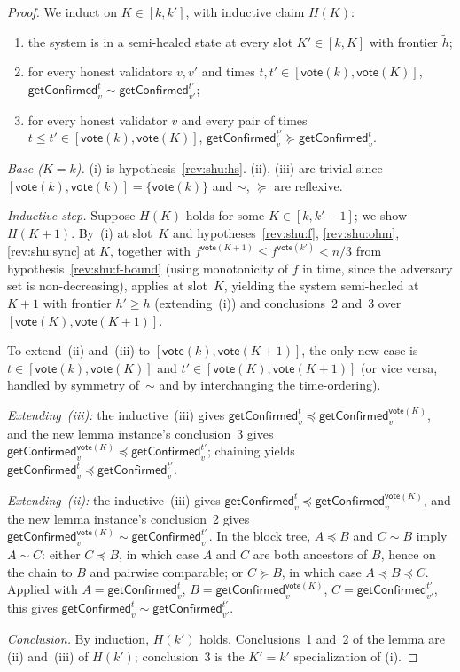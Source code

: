 \ifx\litemode\undefined\documentclass{article}\fi
\newcommand{\vote}{\ensuremath{\mathsf{vote}}}
\newcommand{\comm}[1]{\ensuremath{\widetilde{#1}}}
\newcommand{\getConfirmed}{\textsf{getConfirmed}\xspace}
\theoremstyle{plain}
\theoremstyle{definition}
\theoremstyle{remark}
\begin{document}
\begin{proof}
We induct on $K \in [k, k']$, with inductive claim $H(K)$:
\begin{enumerate}
  \item the system is in a semi-healed state at every slot $K' \in [k, K]$ with frontier $\comm{h}$;
  \item for every honest validators $v, v'$ and times $t, t' \in [\vote(k), \vote(K)]$, $\getConfirmed_v^{t} \sim \getConfirmed_{v'}^{t'}$;
  \item for every honest validator $v$ and every pair of times $t \leq t' \in [\vote(k), \vote(K)]$, $\getConfirmed_v^{t'} \succeq \getConfirmed_v^t$.
\end{enumerate}

\emph{Base ($K = k$).}
(i) is hypothesis~\ref{rev:shu:hs}.
(ii), (iii) are trivial since $[\vote(k), \vote(k)] = \{\vote(k)\}$ and $\sim$, $\succeq$ are reflexive.

\emph{Inductive step.}
Suppose $H(K)$ holds for some $K \in [k, k'-1]$; we show $H(K{+}1)$.
By~(i) at slot~$K$ and hypotheses~\ref{rev:shu:f}, \ref{rev:shu:ohm}, \ref{rev:shu:sync} at $K$, together with $f^{\vote(K+1)} \leq f^{\vote(k')} < n/3$ from hypothesis~\ref{rev:shu:f-bound} (using monotonicity of $f$ in time, since the adversary set is non-decreasing),  applies at slot~$K$, yielding the system semi-healed at $K{+}1$ with frontier $\comm{h}' \geq \comm{h}$ (extending~(i)) and conclusions~2 and~3 over $[\vote(K), \vote(K{+}1)]$.

To extend~(ii) and~(iii) to $[\vote(k), \vote(K{+}1)]$, the only new case is $t \in [\vote(k), \vote(K)]$ and $t' \in [\vote(K), \vote(K{+}1)]$ (or vice versa, handled by symmetry of~$\sim$ and by interchanging the time-ordering).

\emph{Extending~(iii):}
the inductive~(iii) gives $\getConfirmed_v^t \preceq \getConfirmed_v^{\vote(K)}$, and the new lemma instance's conclusion~3 gives $\getConfirmed_v^{\vote(K)} \preceq \getConfirmed_v^{t'}$;
chaining yields $\getConfirmed_v^t \preceq \getConfirmed_v^{t'}$.

\emph{Extending~(ii):}
the inductive~(iii) gives $\getConfirmed_v^t \preceq \getConfirmed_v^{\vote(K)}$, and the new lemma instance's conclusion~2 gives $\getConfirmed_v^{\vote(K)} \sim \getConfirmed_{v'}^{t'}$.
In the block tree, $A \preceq B$ and $C \sim B$ imply $A \sim C$:
either $C \preceq B$, in which case $A$ and $C$ are both ancestors of $B$, hence on the chain to $B$ and pairwise comparable;
or $C \succeq B$, in which case $A \preceq B \preceq C$.
Applied with $A = \getConfirmed_v^t$, $B = \getConfirmed_v^{\vote(K)}$, $C = \getConfirmed_{v'}^{t'}$, this gives $\getConfirmed_v^t \sim \getConfirmed_{v'}^{t'}$.

\emph{Conclusion.}
By induction, $H(k')$ holds.
Conclusions~1 and~2 of the lemma are (ii) and~(iii) of $H(k')$;
conclusion~3 is the $K' = k'$ specialization of (i).
\end{proof}
\end{document}
